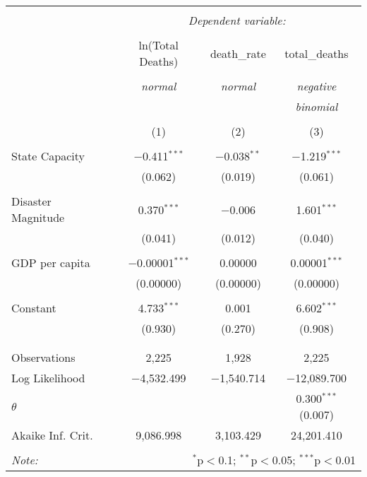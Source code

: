  \begin{table}[!htbp] \centering    \caption{}    \label{}  \begin{tabular}{@{\extracolsep{5pt}}lccc}  \\[-1.8ex]\hline  \hline \\[-1.8ex]   & \multicolumn{3}{c}{\textit{Dependent variable:}} \\  \cline{2-4}  \\[-1.8ex] & ln(Total Deaths) & death\_rate & total\_deaths \\  \\[-1.8ex] & \textit{normal} & \textit{normal} & \textit{negative} \\   & \textit{} & \textit{} & \textit{binomial} \\  \\[-1.8ex] & (1) & (2) & (3)\\  \hline \\[-1.8ex]   State Capacity & $-$0.411$^{***}$ & $-$0.038$^{**}$ & $-$1.219$^{***}$ \\    & (0.062) & (0.019) & (0.061) \\    & & & \\   Disaster Magnitude & 0.370$^{***}$ & $-$0.006 & 1.601$^{***}$ \\    & (0.041) & (0.012) & (0.040) \\    & & & \\   GDP per capita & $-$0.00001$^{***}$ & 0.00000 & 0.00001$^{***}$ \\    & (0.00000) & (0.00000) & (0.00000) \\    & & & \\   Constant & 4.733$^{***}$ & 0.001 & 6.602$^{***}$ \\    & (0.930) & (0.270) & (0.908) \\    & & & \\  \hline \\[-1.8ex]  Observations & 2,225 & 1,928 & 2,225 \\  Log Likelihood & $-$4,532.499 & $-$1,540.714 & $-$12,089.700 \\  $\theta$ &  &  & 0.300$^{***}$  (0.007) \\  Akaike Inf. Crit. & 9,086.998 & 3,103.429 & 24,201.410 \\  \hline  \hline \\[-1.8ex]  \textit{Note:}  & \multicolumn{3}{r}{$^{*}$p$<$0.1; $^{**}$p$<$0.05; $^{***}$p$<$0.01} \\  \end{tabular}  \end{table} 
